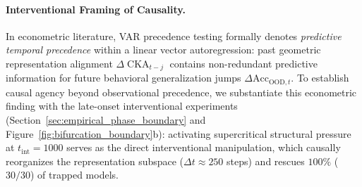 \documentclass{article}
\theoremstyle{plain}
\theoremstyle{definition}
\DeclareMathOperator{\CKA}{CKA}
\begin{document}
\paragraph{Interventional Framing of Causality.}
In econometric literature, VAR precedence testing formally denotes \emph{predictive temporal precedence} within a linear vector autoregression: past geometric representation alignment $\Delta \CKA_{t-j}$ contains non-redundant predictive information for future behavioral generalization jumps $\Delta \text{Acc}_{\text{OOD}, t}$. To establish causal agency beyond observational precedence, we substantiate this econometric finding with the late-onset interventional experiments (Section~\ref{sec:empirical_phase_boundary} and Figure~\ref{fig:bifurcation_boundary}b): activating supercritical structural pressure at $t_{\text{int}} = 1000$ serves as the direct interventional manipulation, which causally reorganizes the representation subspace ($\Delta t \approx 250$ steps) and rescues $100\%$ ($30/30$) of trapped models.


\end{document}
